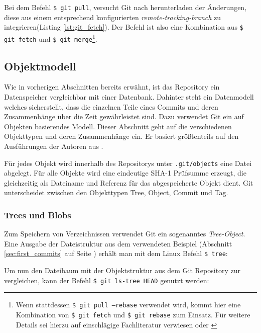Bei dem Befehl \texttt{\$ git pull}, versucht Git nach herunterladen der
Änderungen, diese aus einem entsprechend konfigurierten
\textit{remote-tracking-branch} zu integrieren(Listing \ref{lst:git_fetch}). Der
Befehl ist also eine Kombination aus \texttt{\$ git fetch} und \texttt{\$ git
merge}\footnote{Wenn stattdessen \texttt{\$ git pull --rebase} verwendet wird,
kommt hier eine Kombination von \texttt{\$ git fetch} und \texttt{\$ git
rebase} zum Einsatz. Für weitere Details sei hierzu auf einschlägige
Fachliteratur verwiesen \cite[144-152]{gitosp} oder \cite[85-88]{progit}}.



\subsection{Objektmodell}\label{sec:objectmodel}
Wie in vorherigen Abschnitten bereits erwähnt, ist das Repository ein
Datenspeicher vergleichbar mit einer Datenbank. Dahinter steht ein Datenmodell
welches sicherstellt, dass die einzelnen Teile eines Commits und deren
Zusammenhänge über die Zeit gewährleistet sind. Dazu verwendet Git ein auf
Objekten basierendes Modell. Dieser Abschnitt geht auf die verschiedenen
Objekttypen und deren Zusammenhänge ein. Er basiert größtenteils auf den
Ausführungen der Autoren aus \cite[S.~49-59]{gitosp}.

Für jedes Objekt wird innerhalb des Repositorys unter \texttt{.git/objects}
eine Datei abgelegt. Für alle Objekte wird eine eindeutige \gls{SHA-1}
Prüfsumme erzeugt, die gleichzeitig als Dateiname und Referenz für das
abgespeicherte Objekt dient. Git unterscheidet zwischen den Objekttypen Tree,
Object, Commit und Tag.

\subsubsection{Trees und Blobs}\label{sec:treeblobobjects}
Zum Speichern von Verzeichnissen verwendet Git ein sogenanntes
\textit{Tree-Object}. Eine Ausgabe der Dateistruktur aus dem verwendeten
Beispiel (Abschnitt \ref{sec:first_commits} auf Seite
\pageref{sec:first_commits}) erhält man mit dem Linux Befehl \texttt{\$ tree}:



Um nun den Dateibaum mit der Objektstruktur aus dem Git Repository zur
vergleichen, kann der Befehl \texttt{\$ git ls-tree HEAD} genutzt werden:

